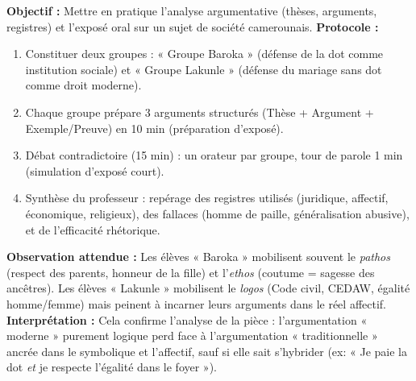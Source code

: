 \documentclass[11pt]{article}
\begin{document}
\begin{experience}
\textbf{Objectif :} Mettre en pratique l'analyse argumentative (thèses, arguments, registres) et l'exposé oral sur un sujet de société camerounais.
\textbf{Protocole :}
\begin{enumerate}
    \item Constituer deux groupes : « Groupe Baroka » (défense de la dot comme institution sociale) et « Groupe Lakunle » (défense du mariage sans dot comme droit moderne).
    \item Chaque groupe prépare 3 arguments structurés (Thèse + Argument + Exemple/Preuve) en 10 min (préparation d'exposé).
    \item Débat contradictoire (15 min) : un orateur par groupe, tour de parole 1 min (simulation d'exposé court).
    \item Synthèse du professeur : repérage des registres utilisés (juridique, affectif, économique, religieux), des fallaces (homme de paille, généralisation abusive), et de l'efficacité rhétorique.
\end{enumerate}
\textbf{Observation attendue :} Les élèves « Baroka » mobilisent souvent le \emph{pathos} (respect des parents, honneur de la fille) et l'\emph{ethos} (coutume = sagesse des ancêtres). Les élèves « Lakunle » mobilisent le \emph{logos} (Code civil, CEDAW, égalité homme/femme) mais peinent à incarner leurs arguments dans le réel affectif.
\textbf{Interprétation :} Cela confirme l'analyse de la pièce : l'argumentation « moderne » purement logique perd face à l'argumentation « traditionnelle » ancrée dans le symbolique et l'affectif, sauf si elle sait s'hybrider (ex: « Je paie la dot \emph{et} je respecte l'égalité dans le foyer »).
\end{experience}
\end{document}
